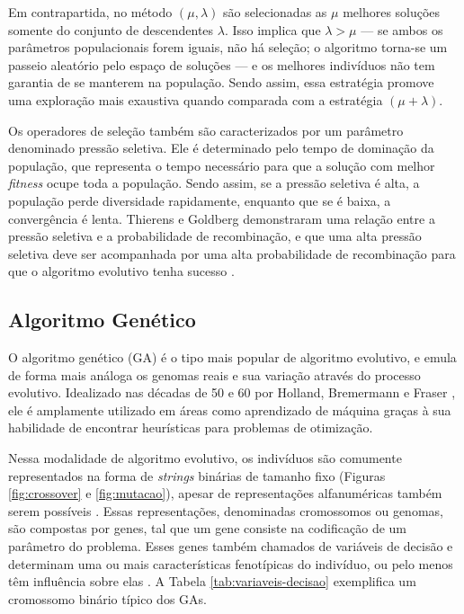\documentclass[
	12pt,				%
	openright,			%
	twoside,			%
	a4paper,			%
	tcc,			%
	]{ABNT-DC-UEL}
\begin{document}
Em contrapartida, no método $(\mu, \lambda)$ são selecionadas as $\mu$ melhores soluções somente do conjunto de descendentes $\lambda$. Isso implica que $\lambda > \mu$ --- se ambos os parâmetros populacionais forem iguais, não há seleção; o algoritmo torna-se um passeio aleatório pelo espaço de soluções --- e os melhores indivíduos não tem garantia de se manterem na população. Sendo assim, essa estratégia promove uma exploração mais exaustiva quando comparada com a estratégia $(\mu + \lambda)$.

Os operadores de seleção também são caracterizados por um parâmetro denominado pressão seletiva. Ele é determinado pelo tempo de dominação da população, que representa o tempo necessário para que a solução com melhor \textit{fitness} ocupe toda a população. Sendo assim, se a pressão seletiva é alta, a população perde diversidade rapidamente, enquanto que se é baixa, a convergência é lenta. Thierens e Goldberg \cite{thierens:93} demonstraram uma relação entre a pressão seletiva e a probabilidade de recombinação, e que uma alta pressão seletiva deve ser acompanhada por uma alta probabilidade de recombinação para que o algoritmo evolutivo tenha sucesso \cite{back:00}.

\subsection{Algoritmo Genético}

O algoritmo genético (GA) é o tipo mais popular de algoritmo evolutivo, e emula de forma mais análoga os genomas reais e sua variação através do processo evolutivo. Idealizado nas décadas de 50 e 60 por Holland, Bremermann e Fraser \cite{holland:62, bremermann:62, fraser:57, holland:75}, ele é amplamente utilizado em áreas como aprendizado de máquina graças à sua habilidade de encontrar heurísticas para problemas de otimização. 

Nessa modalidade de algoritmo evolutivo, os indivíduos são comumente representados na forma de \textit{strings} binárias de tamanho fixo (Figuras \ref{fig:crossover} e \ref{fig:mutacao}), apesar de representações alfanuméricas também serem possíveis \cite{vikhar:16}. Essas representações, denominadas cromossomos ou genomas, são compostas por genes, tal que um gene consiste na codificação de um parâmetro do problema. Esses genes também chamados de variáveis de decisão e determinam uma ou mais características fenotípicas do indivíduo, ou pelo menos têm influência sobre elas \cite{eiben:15}. A Tabela \ref{tab:variaveis-decisao} exemplifica um cromossomo binário típico dos GAs.
\end{document}
